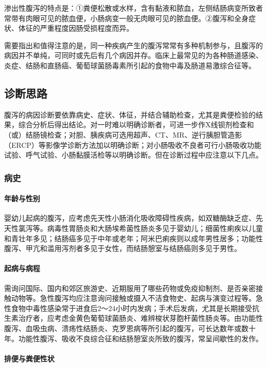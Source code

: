 渗出性腹泻的特点是：①粪便松散或水样，含有黏液和脓血，左侧结肠病变所致者常带有肉眼可见的脓血便，小肠病变一般无肉眼可见的脓血便。②腹泻和全身症状、体征的严重程度因肠受损程度而异。

需要指出和值得注意的是，同一种疾病产生的腹泻常常有多种机制参与，且腹泻的病因并不单纯，可同时或先后有几个病因并存。临床上最常见的为各种肠道感染、炎症、结肠和直肠癌、葡萄球菌肠毒素所引起的食物中毒及肠道易激综合征等。

\subsection{诊断思路}

腹泻的病因诊断要依靠病史、症状、体征，并结合辅助检查，尤其是粪便检验的结果，综合分析后得出结论。对一时难以明确诊断者，可进一步作X线钡剂检查和（或）结肠镜检查；对胆、胰疾病可选用超声、CT、MR、逆行胰胆管造影（ERCP）等影像学诊断方法加以明确诊断；对小肠吸收不良者可行小肠吸收功能试验、呼气试验、小肠黏膜活检等以明确诊断。但在诊断过程中应注意以下几点。

\subsubsection{病史}

\paragraph{年龄与性别}

婴幼儿起病的腹泻，应考虑先天性小肠消化吸收障碍性疾病，如双糖酶缺乏症、先天性氯泻等。病毒性胃肠炎和大肠埃希菌性肠炎多见于婴幼儿；细菌性痢疾以儿童和青壮年多见；结肠癌多见于中年或老年；阿米巴痢疾则以成年男性居多；功能性腹泻、甲亢和滥用泻剂者多见于女性，而结肠憩室与结肠癌则多见于男性。

\paragraph{起病与病程}

需询问国际、国内和郊区旅游史、近期服用了哪些药物或免疫抑制剂、是否亲密接触动物等。急性腹泻均应注意询问接触或摄入不洁食物史、起病与演变过程等。急性食物中毒性感染常于进食后2～24小时内发病；手术后发病，尤其是长期接受抗生素治疗者，应考虑金黄色葡萄球菌肠炎、难辨梭状芽胞杆菌性肠炎等。由功能性腹泻、血吸虫病、溃疡性结肠炎、克罗恩病等所引起的腹泻，可长达数年或数十年。功能性腹泻、吸收不良综合征和结肠憩室炎所致的腹泻，常呈间歇性的发作。

\paragraph{排便与粪便性状}

